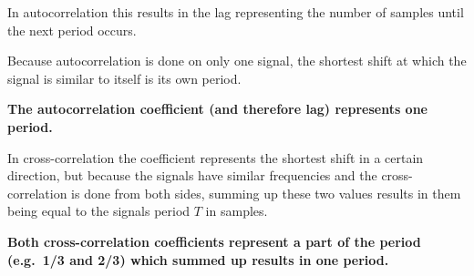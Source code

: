 \documentclass[a4paper, 11pt]{article}
\begin{document}
\begin{enumerate}
        In autocorrelation this results in the lag representing the number of samples until the next period occurs.

        Because autocorrelation is done on only one signal,
        the shortest shift at which the signal is similar to itself is its own period.

        \textbf{The autocorrelation coefficient (and therefore lag) represents one period.}

        In cross-correlation the coefficient represents the shortest shift in a certain direction,
        but because the signals have similar frequencies and the cross-correlation is done from both sides,
        summing up these two values results in them
        being equal to the signals period $T$ in samples.

        \textbf{Both cross-correlation coefficients represent a part of the period (e.g.\ 1/3 and 2/3)
        which summed up results in one period.}
    \end{enumerate}
\end{document}
